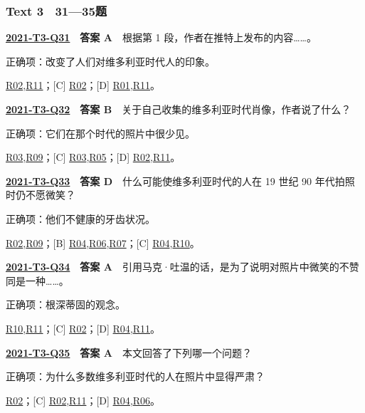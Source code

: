 \documentclass[11pt,a4paper]{article}
\begin{document}
\subsubsection{Text 3　31—35题}
\label{idx-2021-T3-Q31}
\noindent\textbf{\href{https://zj139.github.io/math-notes/english/15275076eb6288b16b2e02f1/\#q31}{2021-T3-Q31}　答案 A}　根据第 1 段，作者在推特上发布的内容……。\par\nopagebreak
\noindent 正确项：改变了人们对维多利亚时代人的印象。\par\nopagebreak
\noindent [B] \hyperref[cat-R02]{R02},\hyperref[cat-R11]{R11}；[C] \hyperref[cat-R02]{R02}；[D] \hyperref[cat-R01]{R01},\hyperref[cat-R11]{R11}。
\par\smallskip
{}\label{idx-2021-T3-Q32}
\noindent\textbf{\href{https://zj139.github.io/math-notes/english/15275076eb6288b16b2e02f1/\#q32}{2021-T3-Q32}　答案 B}　关于自己收集的维多利亚时代肖像，作者说了什么？\par\nopagebreak
\noindent 正确项：它们在那个时代的照片中很少见。\par\nopagebreak
\noindent [A] \hyperref[cat-R03]{R03},\hyperref[cat-R09]{R09}；[C] \hyperref[cat-R03]{R03},\hyperref[cat-R05]{R05}；[D] \hyperref[cat-R02]{R02},\hyperref[cat-R11]{R11}。
\par\smallskip
{}\label{idx-2021-T3-Q33}
\noindent\textbf{\href{https://zj139.github.io/math-notes/english/15275076eb6288b16b2e02f1/\#q33}{2021-T3-Q33}　答案 D}　什么可能使维多利亚时代的人在 19 世纪 90 年代拍照时仍不愿微笑？\par\nopagebreak
\noindent 正确项：他们不健康的牙齿状况。\par\nopagebreak
\noindent [A] \hyperref[cat-R02]{R02},\hyperref[cat-R09]{R09}；[B] \hyperref[cat-R04]{R04},\hyperref[cat-R06]{R06},\hyperref[cat-R07]{R07}；[C] \hyperref[cat-R04]{R04},\hyperref[cat-R10]{R10}。
\par\smallskip
{}\label{idx-2021-T3-Q34}
\noindent\textbf{\href{https://zj139.github.io/math-notes/english/15275076eb6288b16b2e02f1/\#q34}{2021-T3-Q34}　答案 A}　引用马克·吐温的话，是为了说明对照片中微笑的不赞同是一种……。\par\nopagebreak
\noindent 正确项：根深蒂固的观念。\par\nopagebreak
\noindent [B] \hyperref[cat-R10]{R10},\hyperref[cat-R11]{R11}；[C] \hyperref[cat-R02]{R02}；[D] \hyperref[cat-R04]{R04},\hyperref[cat-R11]{R11}。
\par\smallskip
{}\label{idx-2021-T3-Q35}
\noindent\textbf{\href{https://zj139.github.io/math-notes/english/15275076eb6288b16b2e02f1/\#q35}{2021-T3-Q35}　答案 A}　本文回答了下列哪一个问题？\par\nopagebreak
\noindent 正确项：为什么多数维多利亚时代的人在照片中显得严肃？\par\nopagebreak
\noindent [B] \hyperref[cat-R02]{R02}；[C] \hyperref[cat-R02]{R02},\hyperref[cat-R11]{R11}；[D] \hyperref[cat-R04]{R04},\hyperref[cat-R06]{R06}。
\par\smallskip
\end{document}
